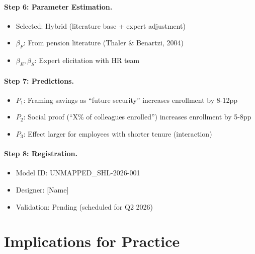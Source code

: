 \paragraph{Step 6: Parameter Estimation.}
\begin{itemize}
\item Selected: Hybrid (literature base + expert adjustment)
\item $\beta_F$: From pension literature (Thaler \& Benartzi, 2004)
\item $\beta_E, \beta_S$: Expert elicitation with HR team
\end{itemize}

\paragraph{Step 7: Predictions.}
\begin{itemize}
\item $P_1$: Framing savings as ``future security'' increases enrollment by 8-12pp
\item $P_2$: Social proof (``X\% of colleagues enrolled'') increases enrollment by 5-8pp
\item $P_3$: Effect larger for employees with shorter tenure (interaction)
\end{itemize}

\paragraph{Step 8: Registration.}
\begin{itemize}
\item Model ID: UNMAPPED_SHL-2026-001
\item Designer: [Name]
\item Validation: Pending (scheduled for Q2 2026)
\end{itemize}


\section{Implications for Practice}
\label{sec:eee-practice}

